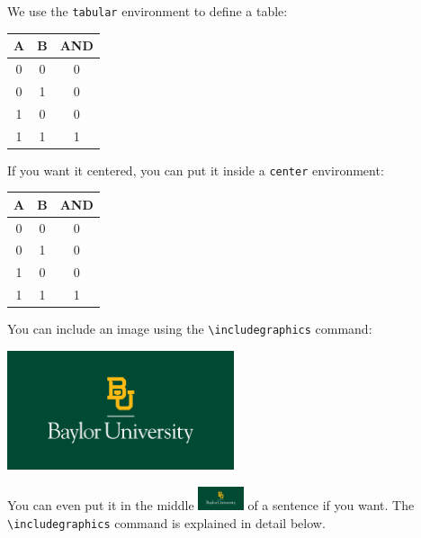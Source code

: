 \documentclass[11pt]{article}
\begin{document}
We use the \texttt{tabular} environment to define a table:

\begin{tabular}{cc|c}
	\toprule
	A & B & AND \\
	\midrule
	0 & 0 & 0 \\
	0 & 1 & 0 \\
	1 & 0 & 0 \\
	1 & 1 & 1 \\
	\bottomrule
\end{tabular} 

If you want it centered, you can put it inside a \texttt{center} environment:

\begin{center}
	\begin{tabular}{cc|c}
		\toprule
		A & B & AND \\
		\midrule
		0 & 0 & 0 \\
		0 & 1 & 0 \\
		1 & 0 & 0 \\
		1 & 1 & 1 \\
		\bottomrule
	\end{tabular} 
\end{center}

You can include an image using the \verb|\includegraphics| command:

\begin{center}
	\includegraphics[width=0.5\textwidth]{BUlogo}
\end{center}

You can even put it in the middle \includegraphics[width=0.1\textwidth]{BUlogo}
of a sentence if you want. The \verb|\includegraphics| command is explained in detail below.
\end{document}
